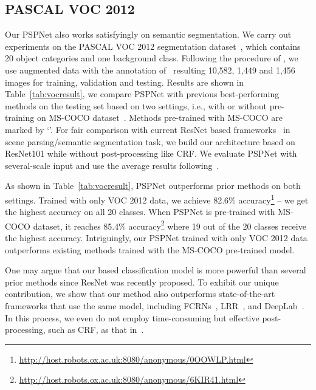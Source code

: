 \documentclass[10pt,twocolumn,letterpaper]{article}
\begin{document}
\begin{table*}
\begin{center}
\begin{tabular}{ l | c c c c c c c c c c c c c c c c c c c c | c}
            \bottomrule[1pt]
        \end{tabular}
    \end{center}
    \caption{Per-class results on PASCAL VOC 2012 testing set. Methods pre-trained on MS-COCO
        are marked with `\dag'.} \label{tab:vocresult}
\end{table*}

\subsection{PASCAL VOC 2012}\label{sec:vocexperiment}
Our PSPNet also works satisfyingly on semantic segmentation. We carry out experiments on
the PASCAL VOC 2012 segmentation dataset~\cite{everingham2010pascal}, which contains 20
object categories and one background class. Following the procedure of
\cite{long2015fully,dai2015boxsup,papandreou2015weakly,chen2014semantic}, we use
augmented data with the annotation of~\cite{hariharan2011semantic} resulting 10,582,
1,449 and 1,456 images for training, validation and testing. Results are shown in
Table~\ref{tab:vocresult}, we compare PSPNet with previous best-performing methods on the
testing set based on two settings, i.e., with or without pre-training on MS-COCO
dataset~\cite{lin2014microsoft}. Methods pre-trained with MS-COCO are marked by `\dag'.
For fair comparison with current ResNet based frameworks~\cite{wu2016bridging,ghiasi2016laplacian,chen2016deeplab}
in scene parsing/semantic segmentation task, we build our architecture
based on ResNet101 while without post-processing like CRF. We evaluate PSPNet with several-scale input and use the average results
following~\cite{chen2014semantic,liu2015parsenet}.

As shown in Table~\ref{tab:vocresult}, PSPNet outperforms prior methods on both settings.
Trained with only VOC 2012 data, we achieve 82.6\%
accuracy\footnote{\href{http://host.robots.ox.ac.uk:8080/anonymous/0OOWLP.html}{http://host.robots.ox.ac.uk:8080/anonymous/0OOWLP.html}}
-- we get the highest accuracy on all 20 classes. When PSPNet is pre-trained with MS-COCO
dataset, it reaches 85.4\%
accuracy\footnote{\href{http://host.robots.ox.ac.uk:8080/anonymous/6KIR41.html}{http://host.robots.ox.ac.uk:8080/anonymous/6KIR41.html}}
where 19 out of the 20 classes receive the highest accuracy. Intriguingly, our PSPNet
trained with only VOC 2012 data outperforms existing methods trained with the MS-COCO
pre-trained model.

One may argue that our based classification model is more powerful than several prior methods
since ResNet was recently proposed. To exhibit our unique contribution, we show that our
method also outperforms state-of-the-art frameworks that use the same model, including
FCRNs~\cite{wu2016bridging}, LRR~\cite{ghiasi2016laplacian}, and
DeepLab~\cite{chen2016deeplab}. In this process, we even do not employ time-consuming but
effective post-processing, such as CRF, as that in~\cite{chen2016deeplab,ghiasi2016laplacian}.
\end{document}
